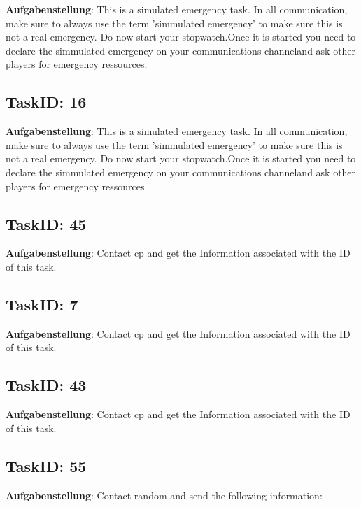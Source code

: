 \documentclass[12pt,a4paper]{scrreprt}
\begin{document}
\textbf{Aufgabenstellung}: This is a simulated emergency task. In all communication, make sure to always use the term 'simmulated emergency' to make sure this is not a real emergency. Do now start your stopwatch.Once it is started you need to declare the simmulated emergency on your communications channeland ask other players for emergency ressources.\subsection{TaskID: 16}
\textbf{Aufgabenstellung}: This is a simulated emergency task. In all communication, make sure to always use the term 'simmulated emergency' to make sure this is not a real emergency. Do now start your stopwatch.Once it is started you need to declare the simmulated emergency on your communications channeland ask other players for emergency ressources.\subsection{TaskID: 45}
\textbf{Aufgabenstellung}: Contact {cp} and get the Information associated with the ID of this task.\subsection{TaskID: 7}
\textbf{Aufgabenstellung}: Contact {cp} and get the Information associated with the ID of this task.\subsection{TaskID: 43}
\textbf{Aufgabenstellung}: Contact {cp} and get the Information associated with the ID of this task.\subsection{TaskID: 55}
\textbf{Aufgabenstellung}: Contact random and send the following information: 
\end{document}
